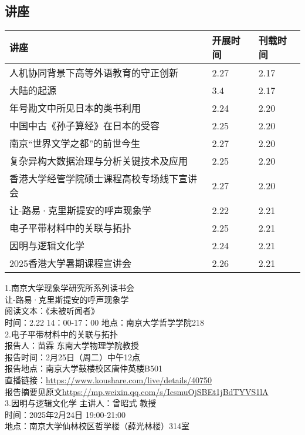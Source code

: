 \documentclass[letterpaper, 12pt]{article}
\begin{document}
\begin{multicols}{2}

\section{讲座}
\begin{tabular}{|>{\centering\arraybackslash}m{}|m{}|m{}|}
    \hline
    讲座 & 开展时间 & 刊载时间\\
    \hline\hline
    人机协同背景下高等外语教育的守正创新 & 2.27 & 2.17\\\hline
    大陆的起源 & 3.4 & 2.17\\\hline
    年号勘文中所见日本的类书利用 & 2.24 & 2.20\\\hline
    中国中古《孙子算经》在日本的受容 & 2.25 & 2.20\\\hline
    南京“世界文学之都”的前世今生 & 2.27 & 2.20\\\hline
    复杂异构大数据治理与分析关键技术及应用 & 2.25 & 2.20\\\hline
    香港大学经管学院硕士课程高校专场线下宣讲会 & 2.27 & 2.20\\\hline
    让-路易·克里斯提安的呼声现象学 & 2.22 & 2.21\\\hline
    电子平带材料中的关联与拓扑 & 2.25 & 2.21\\\hline
    因明与逻辑文化学 & 2.24 & 2.21\\\hline
    2025香港大学暑期课程宣讲会 & 2.26 & 2.21\\\hline
\end{tabular}

1.南京大学现象学研究所系列读书会\\
让-路易·克里斯提安的呼声现象学\\
阅读文本：《未被听闻者》\\
时间：2.22 14：00-17：00 地点：南京大学哲学学院218\\


2.电子平带材料中的关联与拓扑\\
报告人：苗霖 东南大学物理学院教授\\
报告时间：2月25日（周二）中午12点\\
报告地点：南京大学鼓楼校区唐仲英楼B501\\
直播链接：\url{https://www.koushare.com/live/details/40750}\\
报告摘要见原文\url{https://mp.weixin.qq.com/s/IcsmuOjSBEt1jBdTYVS1lA}\\
 
3.因明与逻辑文化学
主讲人：曾昭式  教授\\
时间：2025年2月24日 19:00-21:00\\
地点：南京大学仙林校区哲学楼（薛光林楼）314室\\



\end{multicols}
\end{document}
